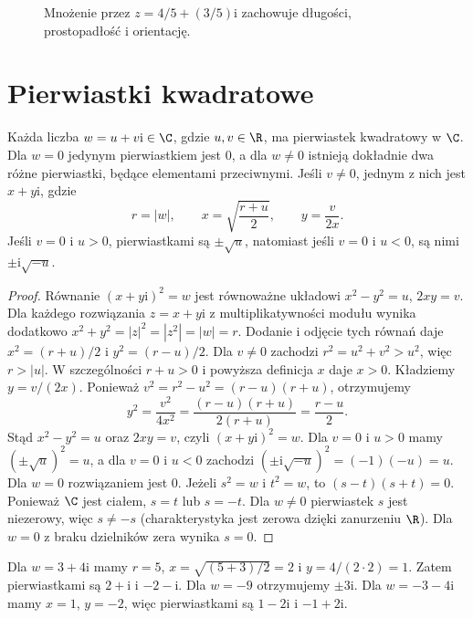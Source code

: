 \begin{figure}[htbp]
\centering
{}
\caption{Mnożenie przez $z=4/5+(3/5)\mathrm i$ zachowuje długości, prostopadłość i orientację.}
\label{ma1:fig:complex-rotation}
\end{figure}
\FloatBarrier

\section{Pierwiastki kwadratowe}
\begin{twierdzenie}
\label{ma1:thm:complex-square-root}
Każda liczba $w=u+v\mathrm i\in\C$, gdzie $u,v\in\R$, ma pierwiastek kwadratowy w $\C$. Dla $w=0$ jedynym pierwiastkiem jest $0$, a dla $w\ne0$ istnieją dokładnie dwa różne pierwiastki, będące elementami przeciwnymi. Jeśli $v\ne0$, jednym z nich jest $x+y\mathrm i$, gdzie
\[
 r=|w|,\qquad x=\sqrt{\frac{r+u}{2}},\qquad y=\frac{v}{2x}.
\]
Jeśli $v=0$ i $u>0$, pierwiastkami są $\pm\sqrt u$, natomiast jeśli $v=0$ i $u<0$, są nimi $\pm\mathrm i\sqrt{-u}$.
\end{twierdzenie}
\begin{proof}
Równanie $(x+y\mathrm i)^2=w$ jest równoważne układowi
$x^2-y^2=u$, $2xy=v$. Dla każdego rozwiązania $z=x+y\mathrm i$ z multiplikatywności modułu wynika dodatkowo $x^2+y^2=|z|^2=|z^2|=|w|=r$. Dodanie i odjęcie tych równań daje $x^2=(r+u)/2$ i $y^2=(r-u)/2$.
Dla $v\ne0$ zachodzi $r^2=u^2+v^2>u^2$, więc $r>|u|$. W szczególności $r+u>0$ i powyższa definicja $x$ daje $x>0$. Kładziemy $y=v/(2x)$. Ponieważ $v^2=r^2-u^2=(r-u)(r+u)$, otrzymujemy
\[
 y^2=\frac{v^2}{4x^2}
 =\frac{(r-u)(r+u)}{2(r+u)}=\frac{r-u}{2}.
\]
Stąd $x^2-y^2=u$ oraz $2xy=v$, czyli $(x+y\mathrm i)^2=w$. Dla $v=0$ i $u>0$ mamy $(\pm\sqrt u)^2=u$, a dla $v=0$ i $u<0$ zachodzi $(\pm\mathrm i\sqrt{-u})^2=(-1)(-u)=u$. Dla $w=0$ rozwiązaniem jest $0$.
Jeżeli $s^2=w$ i $t^2=w$, to $(s-t)(s+t)=0$. Ponieważ $\C$ jest ciałem, $s=t$ lub $s=-t$. Dla $w\ne0$ pierwiastek $s$ jest niezerowy, więc $s\ne-s$ (charakterystyka jest zerowa dzięki zanurzeniu $\R$). Dla $w=0$ z braku dzielników zera wynika $s=0$.
\end{proof}
\begin{przyklad}
Dla $w=3+4\mathrm i$ mamy $r=5$, $x=\sqrt{(5+3)/2}=2$ i $y=4/(2\cdot2)=1$. Zatem pierwiastkami są $2+\mathrm i$ i $-2-\mathrm i$. Dla $w=-9$ otrzymujemy $\pm3\mathrm i$. Dla $w=-3-4\mathrm i$ mamy $x=1$, $y=-2$, więc pierwiastkami są $1-2\mathrm i$ i $-1+2\mathrm i$.
\end{przyklad}

